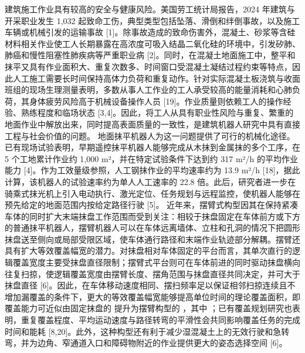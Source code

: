 \markdownRendererDocumentBegin
\markdownRendererSectionBegin
{}\markdownRendererInterblockSeparator
{}建筑施工作业具有较高的安全与健康风险。美国劳工统计局报告，2024 年建筑与开采职业发生 1,032 起致命工伤，典型类型包括坠落、滑倒和绊倒事故，以及施工车辆或机械引发的运输事故 [1]。除事故造成的致命伤害外，混凝土、砂浆等含硅材料相关作业使工人长期暴露在高浓度可吸入结晶二氧化硅的环境中，引发矽肺、肺癌和慢性阻塞性肺疾病等严重职业病 [2]。同时，在混凝土地面施工中，整平和抹平又具有作业面积大、重复次数多、时间窗口受混凝土凝结过程约束等特点，因此人工施工需要长时间保持高体力负荷和重复动作。针对实际混凝土板浇筑与收面班组的现场生理测量表明，多数从事人工作业的工人承受较高的能量消耗和心肺负荷，其身体疲劳风险高于机械设备操作人员 [19]。作业质量则依赖工人的操作经验、熟练程度和临场状态 [3,4]。因此，将工人从具有职业性风险与重复、繁重的地面作业中解放出来，同时提高表面质量的一致性，是建筑机器人研究中具有直接工程与社会价值的问题。\markdownRendererParagraphSeparator
{}地面抹平机器人为这一问题提供了可行的机械化途径。已有现场试验表明，早期遥控抹平机器人能够完成从木抹到金属抹的多个工序，在 5 个工地累计作业约 1,000 m²，并在特定试验条件下达到约 317 m²/h 的平均作业能力 [4]。作为工效量级参照，人工钢抹作业的平均速率约为 13.9 m²/h [18]，据此计算，该机器人的试验速率约为单人人工速率的 22.8 倍。此后，研究者进一步在骑乘式抹光机上引入电动执行、激光定位、任务规划与远程监控，使机器人能够在预先给定的地面范围内按给定路径行驶 [5]。\markdownRendererParagraphSeparator
{}近年来，摆臂式构型因其在保持紧凑车体的同时扩大末端抹盘工作范围而受到关注：相较于抹盘固定在车体前方或下方的普通抹平机器人，摆臂机器人可以在车体远离墙体、立柱和孔洞的情况下把圆形抹盘送至侧向或局部受限区域，使车体通行路径和末端作业轨迹部分解耦。摆臂还具有扩大等效覆盖幅宽的潜力。对抹盘相对车体固定的平台而言，其单次直行的逻辑覆盖宽度主要受抹盘直径限制；摆臂式平台则可在车体前进的同时驱动抹盘横向往复扫掠，使逻辑覆盖宽度由摆臂长度、摆角范围与抹盘直径共同决定，并可大于抹盘直径 [6]。因此，在车体移动速度相同、摆扫频率足以保证相邻扫掠连续且不增加漏覆盖的条件下，更大的等效覆盖幅宽能够提高单位时间的理论覆盖面积，即覆盖能力可近似由固定抹盘的  提升为摆臂构型的 ，其中 ；已有覆盖规划研究也表明，重复覆盖程度、平均运动速度与路径转弯的平滑性会共同影响覆盖任务的完成时间和能耗 [8,20]。此外，这种构型还有利于减少湿混凝土上的无效行驶和急转弯，并为边角、窄通道入口和障碍物附近的作业提供更大的姿态选择空间 [6]。\markdownRendererParagraphSeparator
{}\markdownRendererParagraphSeparator
